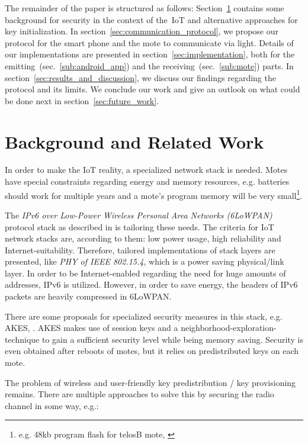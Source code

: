 \documentclass{sig-alternate} %
\begin{document}
The remainder of the paper is structured as follows:
Section~\ref{sec:related_work} contains some background for security in the context of the~IoT and alternative approaches for key initialization.
In section~\ref{sec:communication_protocol}, we propose our protocol for the smart phone and the mote to communicate via light.
Details of our implementations are presented in section~\ref{sec:implementation}, both for the emitting~(sec.~\ref{sub:android_app}) and the receiving~(sec.~\ref{sub:mote}) parts.
In section~\ref{sec:results_and_discussion}, we discuss our findings regarding the protocol and its limits.
We conclude our work and give an outlook on what could be done next in section~\ref{sec:future_work}.


\section{Background and Related Work}
\label{sec:related_work}

In order to make the IoT reality, a specialized network stack is needed.
Motes have special constraints regarding energy and memory resources, e.g. batteries should work for multiple years and a mote's program memory will be very small\footnote{e.g. 48kb program flash for telosB mote, \cite{telosb}}.

The \textit{IPv6 over Low-Power Wireless Personal Area Networks (6LoWPAN)} protocol stack as described in \cite{palattella2013standardized} is tailoring these needs.
The criteria for IoT network stacks are, according to them: low power usage, high reliability and Internet-suitability.
Therefore, tailored implementations of stack layers are presented, like \textit{PHY of IEEE 802.15.4}, which is a power saving physical/link layer.
In order to be Internet-enabled regarding the need for huge amounts of addresses, IPv6 is utilized.
However, in order to save energy, the headers of IPv6 packets are heavily compressed in 6LoWPAN.

There are some proposals for specialized security measures in this stack, e.g. AKES, \cite{krentz15akes}.
AKES makes use of session keys and a neighborhood-exploration-technique to gain a sufficient security level while being memory saving.
Security is even obtained after reboots of motes, but it relies on predistributed keys on each mote.

The problem of wireless and user-friendly key predistribution / key provisioning remains.
There are multiple approaches to solve this by securing the radio channel in some way, e.g.:
\end{document}

